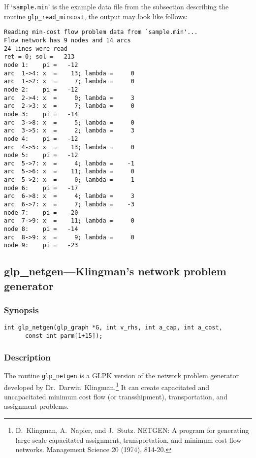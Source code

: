 \documentclass[dvipdfm,11pt]{report}
\begin{document}
If `\verb|sample.min|' is the example data file from the subsection
describing the routine \verb|glp_read_mincost|, the output may look like
follows:

\begin{footnotesize}
\begin{verbatim}
Reading min-cost flow problem data from `sample.min'...
Flow network has 9 nodes and 14 arcs
24 lines were read
ret = 0; sol =   213
node 1:    pi =   -12
arc  1->4: x  =    13; lambda =     0
arc  1->2: x  =     7; lambda =     0
node 2:    pi =   -12
arc  2->4: x  =     0; lambda =     3
arc  2->3: x  =     7; lambda =     0
node 3:    pi =   -14
arc  3->8: x  =     5; lambda =     0
arc  3->5: x  =     2; lambda =     3
node 4:    pi =   -12
arc  4->5: x  =    13; lambda =     0
node 5:    pi =   -12
arc  5->7: x  =     4; lambda =    -1
arc  5->6: x  =    11; lambda =     0
arc  5->2: x  =     0; lambda =     1
node 6:    pi =   -17
arc  6->8: x  =     4; lambda =     3
arc  6->7: x  =     7; lambda =    -3
node 7:    pi =   -20
arc  7->9: x  =    11; lambda =     0
node 8:    pi =   -14
arc  8->9: x  =     9; lambda =     0
node 9:    pi =   -23
\end{verbatim}
\end{footnotesize}

\subsection{glp\_netgen---Klingman's network problem generator}

\subsubsection*{Synopsis}

\begin{verbatim}
int glp_netgen(glp_graph *G, int v_rhs, int a_cap, int a_cost,
      const int parm[1+15]);
\end{verbatim}

\subsubsection*{Description}

The routine \verb|glp_netgen| is a GLPK version of the network problem
generator developed by Dr.~Darwin~Klingman.\footnote{D.~Klingman,
A.~Napier, and J.~Stutz. NETGEN: A program for generating large scale
capacitated assignment, transportation, and minimum cost flow networks.
Management Science 20 (1974), 814-20.} It can create capacitated and
uncapacitated minimum cost flow (or transshipment), transportation, and
assignment problems.
\end{document}
